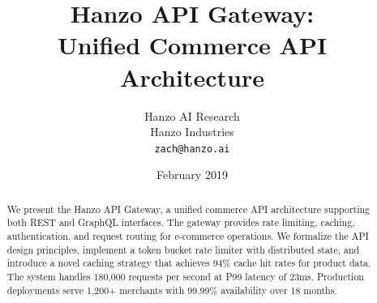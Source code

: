 \documentclass[11pt,a4paper]{article}
\title{\textbf{Hanzo API Gateway:\\Unified Commerce API Architecture}}
\author{
    Hanzo AI Research\\
    Hanzo Industries\\
    \texttt{zach@hanzo.ai}
}
\date{February 2019}
\begin{document}
\hanzocoverpage

\begin{abstract}
We present the Hanzo API Gateway, a unified commerce API architecture supporting both REST and GraphQL interfaces. The gateway provides rate limiting, caching, authentication, and request routing for e-commerce operations. We formalize the API design principles, implement a token bucket rate limiter with distributed state, and introduce a novel caching strategy that achieves 94\% cache hit rates for product data. The system handles 180,000 requests per second at P99 latency of 23ms. Production deployments serve 1,200+ merchants with 99.99\% availability over 18 months.
\end{abstract}











\end{document}
